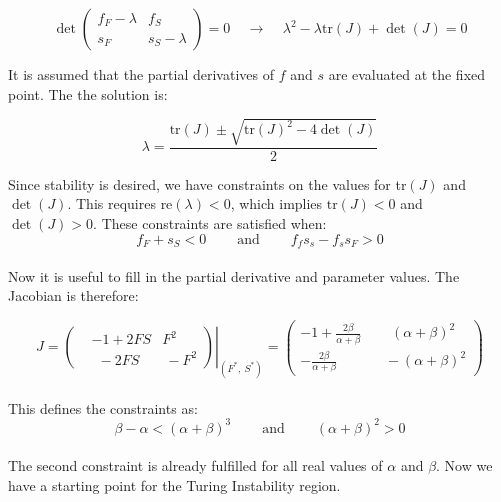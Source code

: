 \documentclass[12pt]{article}
\begin{document}
$$
    \det \left( \begin{matrix}
    f_F-\lambda & f_S \\
    s_F & s_S-\lambda
\end{matrix} \right) = 0 ~~~~~\longrightarrow ~~~~~ \lambda^2 - \lambda\text{tr}(J) + \det(J) = 0
$$ 

\noindent It is assumed that the partial derivatives of $f$ and $s$ are evaluated at the fixed point. The the solution is:

\begin{equation}
\label{eq:lambda}
\lambda = \frac{\text{tr}(J) \pm \sqrt{\text{tr}(J)^2-4\det(J)}}{2} 
\end{equation}

\noindent Since stability is desired, we have constraints on the values for tr$(J)$ and $\det(J)$. This requires $\text{re}(\lambda)<0$, which implies $\text{tr}(J)<0$ and $\det(J)>0$. These constraints are satisfied when:
\\
\begin{equation}
    \label{eq:constraints_generic}
    f_F+s_S < 0 ~~~~~~~~~~ \text{and} ~~~~~~~~~~ f_fs_s-f_ss_F>0 
\end{equation}
\\
\noindent Now it is useful to fill in the partial derivative and parameter values. The Jacobian is therefore:

\begin{equation}
\label{eq:J}
    J =  \left.\left(
\begin{aligned}
    &-1+2FS & F^2~ \\
    &~~-2FS &~ -F^2
\end{aligned} \right)\right|_{(F^*,~S^*)} = \left(
\begin{aligned}
    -1+\frac{2\beta}{\alpha+\beta} ~~&~~~~ (\alpha+\beta)^2 \\
    -\frac{2\beta}{\alpha+\beta} ~~~~&~~ -(\alpha+\beta)^2
\end{aligned} \right)
\end{equation} 
\\
\noindent This defines the constraints as:
\\
\begin{equation}
\label{eq:constraints_w/oDiffusion}
    \beta-\alpha < (\alpha+\beta)^3 ~~~~~~~~~~ \text{and} ~~~~~~~~~~ (\alpha+\beta)^2>0
\end{equation}
\\
\noindent The second constraint is already fulfilled for all real values of $\alpha$ and $\beta$. Now we have a starting point for the Turing Instability region.  
\end{document}
